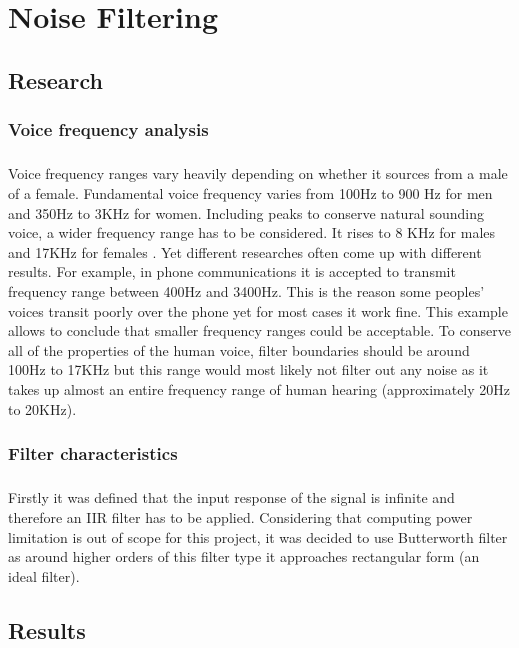 \chapter{Noise Filtering}\label{NoiseFiltering}
\section{Research}
\subsection{Voice frequency analysis}
\paragraph{} Voice frequency ranges vary heavily depending on whether it sources from a male of a female. Fundamental voice frequency varies from 100Hz to 900 Hz for men and 350Hz to 3KHz for women. Including peaks to conserve natural sounding voice, a wider frequency range has to be considered. It rises to 8 KHz for males and 17KHz for females \cite{Seaindia}. Yet different researches often come up with different results. For example, in phone communications it is accepted to transmit frequency range between 400Hz and 3400Hz. This is the reason some peoples' voices transit poorly over the phone yet for most cases it work fine. This example allows to conclude that smaller frequency ranges could be acceptable. To conserve all of the properties of the human voice, filter boundaries should be around 100Hz to 17KHz but this range would most likely not  filter out any noise as it takes up almost an entire frequency range of human hearing (approximately 20Hz to 20KHz).  
\subsection{Filter characteristics}
\paragraph{} Firstly it was defined that the input response of the signal is infinite and therefore an IIR filter has to be applied. Considering that computing power limitation is out of scope for this project, it was decided to use Butterworth filter as around higher orders of this filter type it approaches rectangular form (an ideal filter).  
\section{Results}
